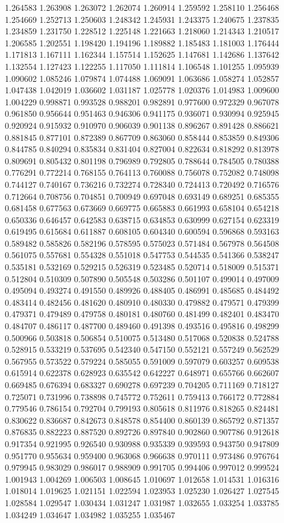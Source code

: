1.264583
1.263908
1.263072
1.262074
1.260914
1.259592
1.258110
1.256468
1.254669
1.252713
1.250603
1.248342
1.245931
1.243375
1.240675
1.237835
1.234859
1.231750
1.228512
1.225148
1.221663
1.218060
1.214343
1.210517
1.206585
1.202551
1.198420
1.194196
1.189882
1.185483
1.181003
1.176444
1.171813
1.167111
1.162344
1.157514
1.152625
1.147681
1.142686
1.137642
1.132554
1.127423
1.122255
1.117050
1.111814
1.106548
1.101255
1.095939
1.090602
1.085246
1.079874
1.074488
1.069091
1.063686
1.058274
1.052857
1.047438
1.042019
1.036602
1.031187
1.025778
1.020376
1.014983
1.009600
1.004229
0.998871
0.993528
0.988201
0.982891
0.977600
0.972329
0.967078
0.961850
0.956644
0.951463
0.946306
0.941175
0.936071
0.930994
0.925945
0.920924
0.915932
0.910970
0.906039
0.901138
0.896267
0.891428
0.886621
0.881845
0.877101
0.872389
0.867709
0.863060
0.858444
0.853859
0.849306
0.844785
0.840294
0.835834
0.831404
0.827004
0.822634
0.818292
0.813978
0.809691
0.805432
0.801198
0.796989
0.792805
0.788644
0.784505
0.780388
0.776291
0.772214
0.768155
0.764113
0.760088
0.756078
0.752082
0.748098
0.744127
0.740167
0.736216
0.732274
0.728340
0.724413
0.720492
0.716576
0.712664
0.708756
0.704851
0.700949
0.697048
0.693149
0.689251
0.685355
0.681458
0.677563
0.673669
0.669775
0.665883
0.661993
0.658104
0.654218
0.650336
0.646457
0.642583
0.638715
0.634853
0.630999
0.627154
0.623319
0.619495
0.615684
0.611887
0.608105
0.604340
0.600594
0.596868
0.593163
0.589482
0.585826
0.582196
0.578595
0.575023
0.571484
0.567978
0.564508
0.561075
0.557681
0.554328
0.551018
0.547753
0.544535
0.541366
0.538247
0.535181
0.532169
0.529215
0.526319
0.523485
0.520714
0.518009
0.515371
0.512804
0.510309
0.507890
0.505548
0.503286
0.501107
0.499014
0.497009
0.495094
0.493274
0.491550
0.489926
0.488405
0.486991
0.485685
0.484492
0.483414
0.482456
0.481620
0.480910
0.480330
0.479882
0.479571
0.479399
0.479371
0.479489
0.479758
0.480181
0.480760
0.481499
0.482401
0.483470
0.484707
0.486117
0.487700
0.489460
0.491398
0.493516
0.495816
0.498299
0.500966
0.503818
0.506854
0.510075
0.513480
0.517068
0.520838
0.524788
0.528915
0.533219
0.537695
0.542340
0.547150
0.552121
0.557249
0.562529
0.567955
0.573522
0.579224
0.585055
0.591009
0.597079
0.603257
0.609538
0.615914
0.622378
0.628923
0.635542
0.642227
0.648971
0.655766
0.662607
0.669485
0.676394
0.683327
0.690278
0.697239
0.704205
0.711169
0.718127
0.725071
0.731996
0.738898
0.745772
0.752611
0.759413
0.766172
0.772884
0.779546
0.786154
0.792704
0.799193
0.805618
0.811976
0.818265
0.824481
0.830622
0.836687
0.842673
0.848578
0.854400
0.860139
0.865792
0.871357
0.876835
0.882223
0.887520
0.892726
0.897840
0.902860
0.907786
0.912618
0.917354
0.921995
0.926540
0.930988
0.935339
0.939593
0.943750
0.947809
0.951770
0.955634
0.959400
0.963068
0.966638
0.970111
0.973486
0.976764
0.979945
0.983029
0.986017
0.988909
0.991705
0.994406
0.997012
0.999524
1.001943
1.004269
1.006503
1.008645
1.010697
1.012658
1.014531
1.016316
1.018014
1.019625
1.021151
1.022594
1.023953
1.025230
1.026427
1.027545
1.028584
1.029547
1.030434
1.031247
1.031987
1.032655
1.033254
1.033785
1.034249
1.034647
1.034982
1.035255
1.035467
